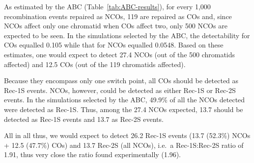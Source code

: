 As estimated by the ABC (Table~\ref{tab:ABC-results}), for every 1,000 recombination events repaired as NCOs, 119 are repaired as COs and, since NCOs affect only one chromatid when COs affect two, only 500 NCOs are expected to be seen. 
In the simulations selected by the ABC, the detectability for COs equalled 0.105 while that for NCOs equalled 0.0548. 
Based on these estimates, one would expect to detect 27.4 NCOs (out of the 500 chromatids affected) and 12.5 COs (out of the 119 chromatids affected).

Because they encompass only one switch point, all COs should be detected as Rec-1S events.
NCOs, however, could be detected as either Rec-1S or Rec-2S events. 
In the simulations selected by the ABC, 49.9\% of all the NCOs detected were detected as Rec-1S. 
Thus, among the 27.4 NCOs expected, 13.7 should be detected as Rec-1S events and 13.7 as Rec-2S events. 

All in all thus, we would expect to detect 26.2 Rec-1S events (13.7 (52.3\%) NCOs + 12.5 (47.7\%) COs) and 13.7 Rec-2S (all NCOs), i.e.\ a Rec-1S:Rec-2S ratio of 1.91, thus very close the ratio found experimentally (1.96).












